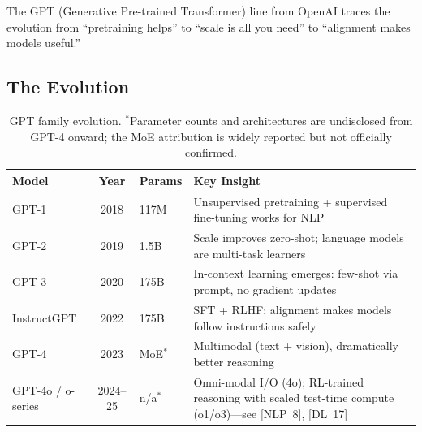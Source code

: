The GPT (Generative Pre-trained Transformer) line from OpenAI traces the
evolution from ``pretraining helps'' to ``scale is all you need'' to
``alignment makes models useful.''

\subsection{The Evolution}

\begin{table}[H]
\centering
\small
\begin{tabularx}{\textwidth}{@{}l c l X@{}}
\toprule
\textbf{Model} & \textbf{Year} & \textbf{Params} & \textbf{Key Insight} \\
\midrule
GPT-1    & 2018 & 117M  & Unsupervised pretraining + supervised fine-tuning works for NLP \\
GPT-2    & 2019 & 1.5B  & Scale improves zero-shot; language models are multi-task learners \\
GPT-3    & 2020 & 175B  & In-context learning emerges: few-shot via prompt, no gradient updates \\
InstructGPT & 2022 & 175B & SFT + RLHF: alignment makes models follow instructions safely \\
GPT-4    & 2023 & MoE$^*$ & Multimodal (text + vision), dramatically better reasoning \\
GPT-4o / o-series & 2024--25 & n/a$^*$ & Omni-modal I/O (4o); RL-trained reasoning with
    scaled test-time compute (o1/o3)---see [NLP~8], [DL~17] \\
\bottomrule
\end{tabularx}
\caption{GPT family evolution.  $^*$Parameter counts and architectures are
undisclosed from GPT-4 onward; the MoE attribution is widely reported but
not officially confirmed.}
\label{tab:gpt-family}
\end{table}

